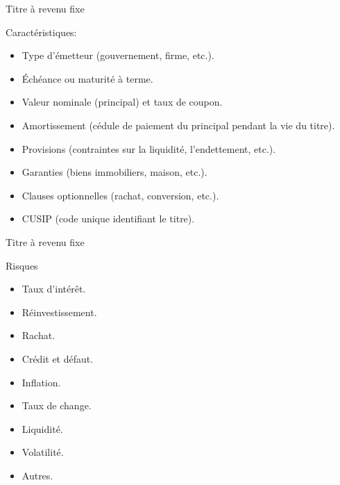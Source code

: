 \documentclass{beamer}
\begin{document}
\begin{frame}{Titre à revenu fixe}
\begin{block}{Caractéristiques:}
\begin{itemize}
\item Type d’émetteur (gouvernement, firme, etc.).
\item Échéance ou maturité à terme.
\item Valeur nominale (principal) et taux de coupon.
\item Amortissement (cédule de paiement du principal pendant la vie du titre).
\item Provisions (contraintes sur la liquidité, l’endettement, etc.).
\item Garanties (biens immobiliers, maison, etc.).
\item  Clauses optionnelles (rachat, conversion, etc.).
\item CUSIP (code unique identifiant le titre).
\end{itemize}
\end{block}

\end{frame}



\begin{frame}{Titre à revenu fixe}
\begin{block}{Risques}
\begin{itemize}
\item Taux d’intérêt.
\item Réinvestissement.
\item Rachat.
\item Crédit et défaut.
\item Inflation.
\item Taux de change.
\item Liquidité.
\item Volatilité.
\item Autres.
\end{itemize}
\end{block}

\end{frame}
\end{document}
